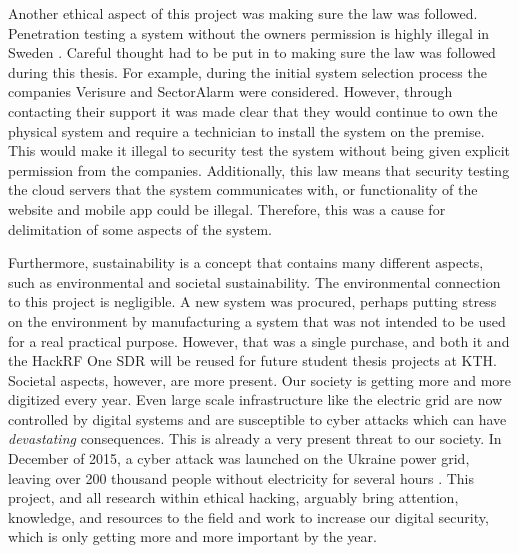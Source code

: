 Another ethical aspect of this project was making sure the law was followed. Penetration testing a system without the owners permission is highly illegal in Sweden \cite{brottsbalken-it-brott}. Careful thought had to be put in to making sure the law was followed during this thesis. For example, during the initial system selection process the companies Verisure and SectorAlarm were considered. However, through contacting their support it was made clear that they would continue to own the physical system and require a technician to install the system on the premise. This would make it illegal to security test the system without being given explicit permission from the companies. Additionally, this law means that security testing the cloud servers that the system communicates with, or functionality of the website and mobile app could be illegal. Therefore, this was a cause for delimitation of some aspects of the system.

Furthermore, sustainability is a concept that contains many different aspects, such as environmental and societal sustainability. The environmental connection to this project is negligible. A new system was procured, perhaps putting stress on the environment by manufacturing a system that was not intended to be used for a real practical purpose. However, that was a single purchase, and both it and the HackRF One SDR will be reused for future student thesis projects at KTH. Societal aspects, however, are more present. Our society is getting more and more digitized every year. Even large scale infrastructure like the electric grid are now controlled by digital systems and are susceptible to cyber attacks which can have \textit{devastating} consequences. This is already a very present threat to our society. In December of 2015, a cyber attack was launched on the Ukraine power grid, leaving over 200 thousand people without electricity for several hours \cite{urkaine-power-grid-analysis}. This project, and all research within ethical hacking, arguably bring attention, knowledge, and resources to the field and work to increase our digital security, which is only getting more and more important by the year.
